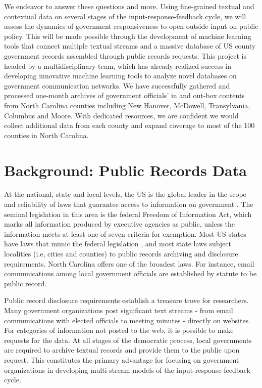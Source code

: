 We endeavor to answer these questions and more. Using fine-grained textual and contextual data on several stages of the input-response-feedback cycle, we will assess the dynamics of government responsiveness to open outside input on public policy. This will be made possible through the development of machine learning tools that connect multiple textual streams and a massive database of US county government records assembled through public records requests. This project is headed by a multidisciplinary team, which has already realized success in developing innovative machine learning tools to analyze novel databases on government communication networks. We have successfully gathered and processed one-month archives of government officials' in and out-box contents from North Carolina counties including New Hanover, McDowell, Transylvania, Columbus and Moore. With dedicated resources, we are confident we would collect additional data from each county and expand coverage to most of the 100 counties in North Carolina.


\section{Background: Public Records Data}

At the national, state and local levels, the US is the global leader in the scope and reliability of laws that guarantee access to information on government \cite{Halstuk2006}. The seminal legislation in this area is the federal Freedom of Information Act, which marks all information produced by executive agencies as public, unless the information meets at least one of seven criteria for exemption. Most US states have laws that mimic the federal legislation \cite{Braverman1980}, and most state laws subject localities (i.e, cities and counties) to public records archiving and disclosure requirements. North Carolina offers one of the broadest laws. For instance, email communications among local government officials are established by statute to be public record. 

Public record disclosure requirements establish a treasure trove for researchers. Many government organizations post significant text streams - from email communications with elected officials to meeting minutes - directly on websites. For categories of information not posted to the web, it is possible to make requests for the data. At all stages of the democratic process, local governments are required to archive textual records and provide them to the public upon request. This constitutes the primary advantage for focusing on government organizations in developing multi-stream models of the input-response-feedback cycle. 

